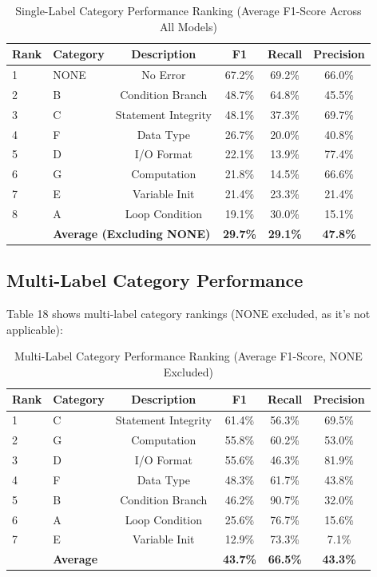 \documentclass[12pt,a4paper]{article}
\begin{document}
\begin{table}[H]
\centering

\label{tab:single_category_ranking}
\begin{tabular}{llcccc}
\toprule
\textbf{Rank} & \textbf{Category} & \textbf{Description} & \textbf{F1} & \textbf{Recall} & \textbf{Precision} \\
\midrule
1 & NONE & No Error & 67.2\% & 69.2\% & 66.0\% \\
2 & B & Condition Branch & 48.7\% & 64.8\% & 45.5\% \\
3 & C & Statement Integrity & 48.1\% & 37.3\% & 69.7\% \\
4 & F & Data Type & 26.7\% & 20.0\% & 40.8\% \\
5 & D & I/O Format & 22.1\% & 13.9\% & 77.4\% \\
6 & G & Computation & 21.8\% & 14.5\% & 66.6\% \\
7 & E & Variable Init & 21.4\% & 23.3\% & 21.4\% \\
8 & A & Loop Condition & 19.1\% & 30.0\% & 15.1\% \\
\midrule
 & \multicolumn{2}{l}{\textbf{Average (Excluding NONE)}} & \textbf{29.7\%} & \textbf{29.1\%} & \textbf{47.8\%} \\
\bottomrule
\end{tabular}
\caption{Single-Label Category Performance Ranking (Average F1-Score Across All Models)}
\end{table}

\subsection{Multi-Label Category Performance}

Table 18 shows multi-label category rankings (NONE excluded, as it's not applicable):

\begin{table}[H]
\centering
\label{tab:multi_category_ranking}
\begin{tabular}{llcccc}
\toprule
\textbf{Rank} & \textbf{Category} & \textbf{Description} & \textbf{F1} & \textbf{Recall} & \textbf{Precision} \\
\midrule
1 & C & Statement Integrity & 61.4\% & 56.3\% & 69.5\% \\
2 & G & Computation & 55.8\% & 60.2\% & 53.0\% \\
3 & D & I/O Format & 55.6\% & 46.3\% & 81.9\% \\
4 & F & Data Type & 48.3\% & 61.7\% & 43.8\% \\
5 & B & Condition Branch & 46.2\% & 90.7\% & 32.0\% \\
6 & A & Loop Condition & 25.6\% & 76.7\% & 15.6\% \\
7 & E & Variable Init & 12.9\% & 73.3\% & 7.1\% \\
\midrule
 & \multicolumn{2}{l}{\textbf{Average}} & \textbf{43.7\%} & \textbf{66.5\%} & \textbf{43.3\%} \\
\bottomrule
\end{tabular}
\caption{Multi-Label Category Performance Ranking (Average F1-Score, NONE Excluded)}

\end{table}
\end{document}
